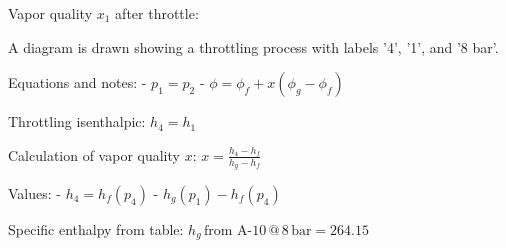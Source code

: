 Vapor quality \( x_1 \) after throttle:  

A diagram is drawn showing a throttling process with labels '4', '1', and '8 bar'.  

Equations and notes:  
- \( p_1 = p_2 \)  
- \( \phi = \phi_f + x (\phi_g - \phi_f) \)  

Throttling isenthalpic:  
\( h_4 = h_1 \)  

Calculation of vapor quality \( x \):  
\( x = \frac{h_4 - h_f}{h_g - h_f} \)  

Values:  
- \( h_4 = h_f(p_4) \)  
- \( h_g(p_1) - h_f(p_4) \)  

Specific enthalpy from table:  
\( h_g \, \text{from A-10} \, @ \, 8 \, \text{bar} = 264.15 \)